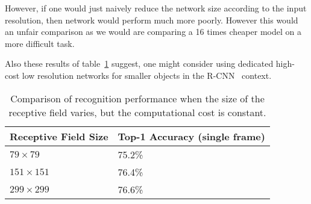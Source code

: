 However, if one would just naively reduce the network size according to the
input resolution, then network would perform much more poorly. However this
would an unfair comparison as we would are comparing a 16 times cheaper model on
a more difficult task.

Also these results of table~\ref{lowrescmp} suggest, one might consider using
dedicated high-cost low resolution networks for smaller objects in the
R-CNN~\cite{girshick2014rcnn} context.

\begin{table}
{
 \begin{center}
   \begin{tabular}[H]{|l|l|}
   \hline
   {\bf Receptive Field Size} & {\bf Top-1 Accuracy (single frame)}\\
   \hline\hline
   $79\times 79$ & 75.2\% \\
   \hline
   $151\times 151$ & 76.4\% \\
   \hline
   $299\times 299$ & 76.6\% \\
   \hline
   \end{tabular}
 \end{center}
 }
\caption{Comparison of recognition performance when the size of the receptive
field varies, but the computational cost is constant.}
\label{lowrescmp}
\end{table}
